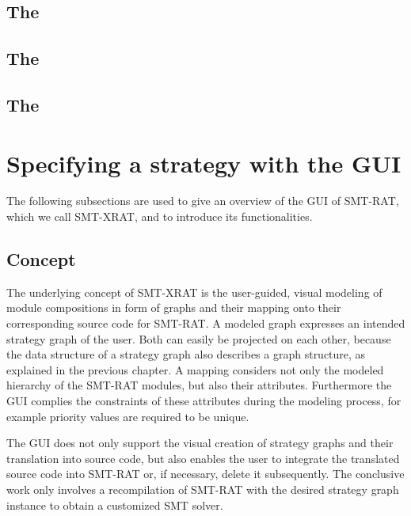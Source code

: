 \subsection{The \gbModuleClass}

\subsection{The \vsModuleClass}

\subsection{The \cadModuleClass}


\section{Specifying a strategy with the GUI}

The following subsections are used to give an overview of the 
GUI of SMT-RAT, which we call SMT-XRAT, and to introduce its 
functionalities.

\subsection{Concept}
\label{sec:concept_of_smt-xrat}
The underlying concept of SMT-XRAT is the user-guided, visual 
modeling of module compositions in form of graphs and their 
mapping onto their corresponding source code for SMT-RAT. A 
modeled graph expresses an intended strategy graph of the user. 
Both can easily be projected on each other, because the data 
structure of a strategy graph also describes a graph structure, 
as explained in the previous chapter. A mapping considers not 
only the modeled hierarchy of the SMT-RAT modules, but also 
their attributes. Furthermore the GUI complies the constraints 
of these attributes during the modeling process, for example 
priority values are required to be unique.

The GUI does not only support the visual creation of strategy 
graphs and their translation into source code, but also enables 
the user to integrate the translated source code into SMT-RAT or, 
if necessary, delete it subsequently. The conclusive work only 
involves a recompilation of SMT-RAT with the desired strategy 
graph instance to obtain a customized SMT solver.

